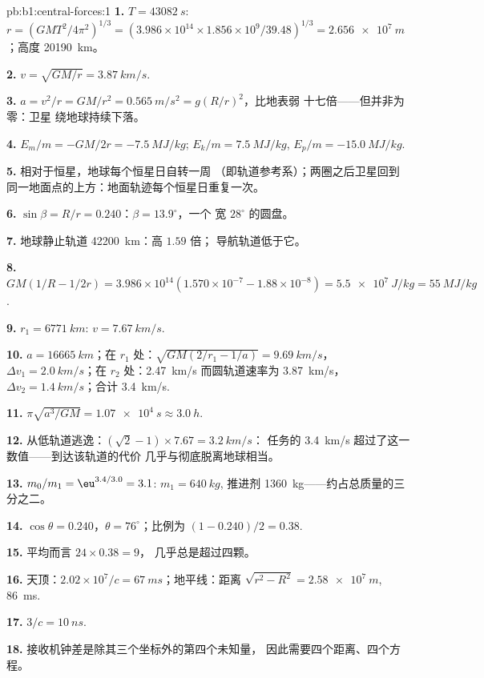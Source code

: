\begin{solution}{pb:b1:central-forces:1}
\textbf{1.} $T = \qty{43082}{s}$: $r = (GMT^2/4\pi^2)^{1/3} = (3.986\times10^{14}
\times 1.856\times10^9/39.48)^{1/3} = \qty{2.656e7}{m}$；高度
\qty{20190}{km}。

\textbf{2.} $v = \sqrt{GM/r} = \qty{3.87}{km/s}$.

\textbf{3.} $a = v^2/r = GM/r^2 = \qty{0.565}{m/s^2} = g(R/r)^2$，比地表弱
十七倍——但并非为零：卫星
绕地球持续下落。

\textbf{4.} $E_m/m = -GM/2r = \qty{-7.5}{MJ/kg}$; $E_k/m = \qty{+7.5}{MJ/kg}$,
$E_p/m = \qty{-15.0}{MJ/kg}$.

\textbf{5.} 相对于恒星，地球每个恒星日自转一周
（即轨道参考系）；两圈之后卫星回到
同一地面点的上方：地面轨迹每个恒星日重复一次。

\textbf{6.} $\sin\beta = R/r = 0.240$：$\beta = 13.9^\circ$，一个
宽 $28^\circ$ 的圆盘。

\textbf{7.} 地球静止轨道 \qty{42200}{km}：高 $1.59$ 倍；
导航轨道低于它。

\textbf{8.} $GM(1/R - 1/2r) = 3.986\times10^{14}(1.570\times10^{-7} - 1.88\times
10^{-8}) = \qty{5.5e7}{J/kg} = \qty{55}{MJ/kg}$.

\textbf{9.} $r_1 = \qty{6771}{km}$: $v = \qty{7.67}{km/s}$.

\textbf{10.} $a = \qty{16665}{km}$；在 $r_1$ 处：$\sqrt{GM(2/r_1 - 1/a)} =
\qty{9.69}{km/s}$，$\Delta v_1 = \qty{2.0}{km/s}$；在 $r_2$ 处：\qty{2.47}{km/s}
而圆轨道速率为 \qty{3.87}{km/s}，$\Delta v_2 = \qty{1.4}{km/s}$；合计
\qty{3.4}{km/s}.

\textbf{11.} $\pi\sqrt{a^3/GM} = \qty{1.07e4}{s} \approx \qty{3.0}{h}$.

\textbf{12.} 从低轨道逃逸：$(\sqrt2 - 1)\times 7.67 = \qty{3.2}{km/s}$：
任务的 \qty{3.4}{km/s} 超过了这一数值——到达该轨道的代价
几乎与彻底脱离地球相当。

\textbf{13.} $m_0/m_1 = \eu^{3.4/3.0} = 3.1$: $m_1 = \qty{640}{kg}$,
推进剂 \qty{1360}{kg}——约占总质量的三分之二。

\textbf{14.} $\cos\theta = 0.240$，$\theta = 76^\circ$；比例为 $(1 - 0.240)/2
= 0.38$.

\textbf{15.} 平均而言 $24 \times 0.38 = 9$，
几乎总是超过四颗。

\textbf{16.} 天顶：$2.02\times10^7/c = \qty{67}{ms}$；地平线：距离
$\sqrt{r^2 - R^2} = \qty{2.58e7}{m}$, \qty{86}{ms}.

\textbf{17.} $3/c = \qty{10}{ns}$.

\textbf{18.} 接收机钟差是除其三个坐标外的第四个未知量，
因此需要四个距离、四个方程。


\end{solution}
